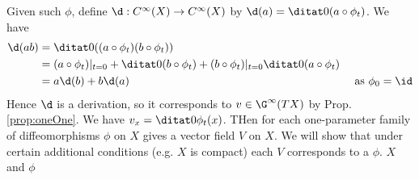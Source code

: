 \noindent
Given such $\phi$, define $\d : C^\infty(X) \to C^\infty(X)$ by $\d(a) = \ditat 0 (a \circ \phi_t)$. We have
\begin{align*}
  \d(ab) &= \ditat 0 ((a \circ \phi_t) (b \circ \phi_t))\\
  &= (a \circ \phi_t)|_{t=0} + \ditat 0 (b \circ \phi_t) + (b \circ \phi_t)|_{t=0} \ditat 0 (a \circ \phi_t) \\
  &= a \d(b) + b \d(a) & \text{ as } \phi_0 = \id
\end{align*}
\noindent
Hence $\d$ is a derivation, so it corresponds to $v \in \G^\infty(TX)$ by Prop. \ref{prop:oneOne}. We have $v_x = \ditat 0 \phi_t(x)$. THen for each one-parameter family of diffeomorphisms $\phi$ on $X$ gives a vector field $V$ on $X$. We will show that under certain additional conditions (e.g. $X$ is compact) each $V$ corresponds to a $\phi$. $X$ and $\phi$ 


